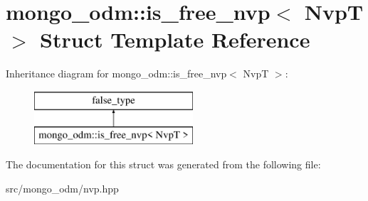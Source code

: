 \hypertarget{structmongo__odm_1_1is__free__nvp}{}\section{mongo\+\_\+odm\+:\+:is\+\_\+free\+\_\+nvp$<$ NvpT $>$ Struct Template Reference}
\label{structmongo__odm_1_1is__free__nvp}
Inheritance diagram for mongo\+\_\+odm\+:\+:is\+\_\+free\+\_\+nvp$<$ NvpT $>$\+:\begin{figure}[H]
\begin{center}
\leavevmode
\includegraphics[height=2.000000cm]{structmongo__odm_1_1is__free__nvp}
\end{center}
\end{figure}


The documentation for this struct was generated from the following file\+:\begin{DoxyCompactItemize}
\item 
src/mongo\+\_\+odm/nvp.\+hpp\end{DoxyCompactItemize}
